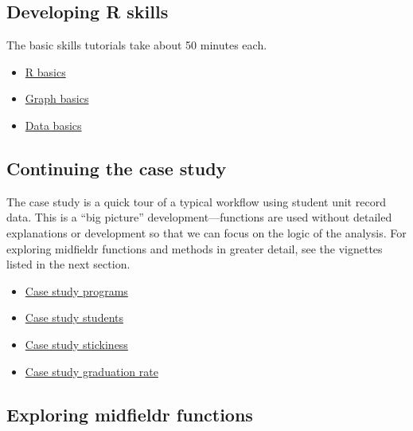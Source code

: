\documentclass[
]{book}
\providecommand{\tightlist}{%
  \setlength{\itemsep}{0pt}\setlength{\parskip}{0pt}}
\begin{document}
\hypertarget{developing-r-skills}{%
\subsection{Developing R skills}\label{developing-r-skills}}

The basic skills tutorials take about 50 minutes each.

\begin{itemize}
\tightlist
\item
  \protect\hyperlink{r-basics}{R basics}
\item
  \protect\hyperlink{graph-basics}{Graph basics}\\
\item
  \protect\hyperlink{data-basics}{Data basics}
\end{itemize}

\hypertarget{continuing-the-case-study}{%
\subsection{Continuing the case study}\label{continuing-the-case-study}}

The case study is a quick tour of a typical workflow using student unit record data. This is a ``big picture'' development---functions are used without detailed explanations or development so that we can focus on the logic of the analysis. For exploring midfieldr functions and methods in greater detail, see the vignettes listed in the next section.

\begin{itemize}
\tightlist
\item
  \href{https://midfieldr.github.io/midfieldr/articles/art-110-case-study-programs.html}{Case study programs}
\item
  \href{https://midfieldr.github.io/midfieldr/articles/art-120-case-study-students.html}{Case study students}
\item
  \href{https://midfieldr.github.io/midfieldr/articles/art-130-case-study-stickiness.html}{Case study stickiness}
\item
  \href{https://midfieldr.github.io/midfieldr/articles/art-140-case-study-grad-rate.html}{Case study graduation rate}
\end{itemize}

\hypertarget{exploring-midfieldr-functions}{%
\subsection{Exploring midfieldr functions}\label{exploring-midfieldr-functions}}
\end{document}
